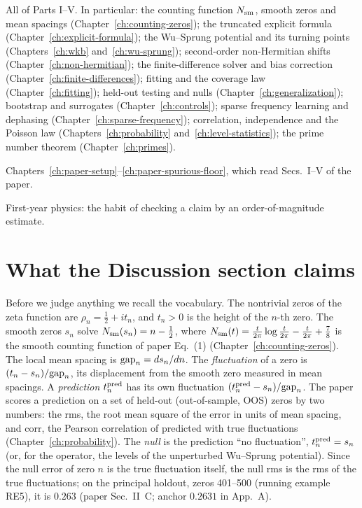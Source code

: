 \begin{prerequisites}
\item All of Parts I--V. In particular: the counting function $N_{\mathrm{sm}}$, smooth zeros and mean spacings (Chapter~\ref{ch:counting-zeros}); the truncated explicit formula (Chapter~\ref{ch:explicit-formula}); the Wu--Sprung potential and its turning points (Chapters~\ref{ch:wkb} and~\ref{ch:wu-sprung}); second-order non-Hermitian shifts (Chapter~\ref{ch:non-hermitian}); the finite-difference solver and bias correction (Chapter~\ref{ch:finite-differences}); fitting and the coverage law (Chapter~\ref{ch:fitting}); held-out testing and nulls (Chapter~\ref{ch:generalization}); bootstrap and surrogates (Chapter~\ref{ch:controls}); sparse frequency learning and dephasing (Chapter~\ref{ch:sparse-frequency}); correlation, independence and the Poisson law (Chapters~\ref{ch:probability} and~\ref{ch:level-statistics}); the prime number theorem (Chapter~\ref{ch:primes}).
\item Chapters~\ref{ch:paper-setup}--\ref{ch:paper-spurious-floor}, which read Secs.~I--V of the paper.
\item First-year physics: the habit of checking a claim by an order-of-magnitude estimate.
\end{prerequisites}

\section{What the Discussion section claims}\label{sec:paper-critique-claims}

Before we judge anything we recall the vocabulary. The nontrivial zeros of the zeta function are $\rho_n=\tfrac12+it_n$, and $t_n>0$ is the height of the $n$-th zero. The smooth zeros $s_n$ solve $N_{\mathrm{sm}}(s_n)=n-\tfrac12$, where $N_{\mathrm{sm}}(t)=\frac{t}{2\pi}\log\frac{t}{2\pi}-\frac{t}{2\pi}+\frac78$ is the smooth counting function of paper Eq.~(1) (Chapter~\ref{ch:counting-zeros}). The local mean spacing is $\mathrm{gap}_n=ds_n/dn$. The \emph{fluctuation} of a zero is $(t_n-s_n)/\mathrm{gap}_n$, its displacement from the smooth zero measured in mean spacings. A \emph{prediction} $t^{\rm pred}_n$ has its own fluctuation $(t^{\rm pred}_n-s_n)/\mathrm{gap}_n$. The paper scores a prediction on a set of held-out (out-of-sample, OOS) zeros by two numbers: the rms, the root mean square of the error in units of mean spacing, and corr, the Pearson correlation of predicted with true fluctuations (Chapter~\ref{ch:probability}). The \emph{null} is the prediction ``no fluctuation'', $t^{\rm pred}_n=s_n$ (or, for the operator, the levels of the unperturbed Wu--Sprung potential). Since the null error of zero $n$ is the true fluctuation itself, the null rms is the rms of the true fluctuations; on the principal holdout, zeros 401--500 (running example RE5), it is $0.263$ (paper Sec.~II~C; anchor $0.2631$ in App.~A).

